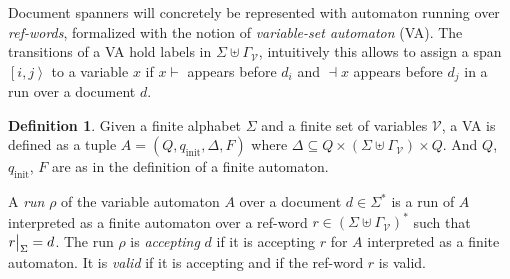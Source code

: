 \documentclass[12px]{article}
\theoremstyle{definition}
\newtheorem{definition}{Definition}
\newcommand{\Span}[1]{\left[ #1 \right\rangle}
\newcommand\restr[2]{{%
  \left.\kern-\nulldelimiterspace %
  #1 %
  \vphantom{\big|} %
  \right|_{#2} %
  }}
\begin{document}

        Document spanners will concretely be represented with automaton running
        over \textit{ref-words}, formalized with the notion of
        \textit{variable-set automaton} (VA). The transitions of a VA hold
        labels in $\Sigma \uplus \Gamma_\mathcal{V}$, intuitively this allows
        to assign a span $\Span{i, j}$ to a variable $x$ if $x{\vdash}$ appears
        before $d_i$ and ${\dashv}x$ appears before $d_j$ in a run over a
        document $d$.

        \begin{definition}
          Given a finite alphabet $\Sigma$ and a finite set of variables
          $\mathcal{V}$, a VA is defined as a tuple $A = (Q, q_\text{init},
          \Delta, F)$ where $\Delta \subseteq Q \times (\Sigma \uplus
          \Gamma_\mathcal{V}) \times Q$. And $Q$, $q_\text{init}$, $F$ are as
          in the definition of a finite automaton.


          A \textit{run} $\rho$ of the variable automaton $A$ over a document
          $d \in \Sigma^*$ is a run of $A$ interpreted as a finite automaton
          over a ref-word $r \in {(\Sigma \uplus \Gamma_\mathcal{V})}^*$ such
          that $\restr{r}{\Sigma} = d$. The run $\rho$ is \textit{accepting}
          $d$ if it is accepting $r$ for $A$ interpreted as a finite automaton.
          It is \textit{valid} if it is accepting and if the ref-word $r$ is
          valid.
        \end{definition}

\end{document}
